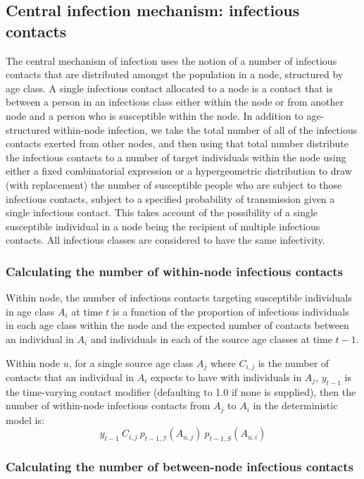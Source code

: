 \documentclass[11pt]{article}
\begin{document}
\subsection{Central infection mechanism: infectious contacts }

The central mechanism of infection uses the notion of a number of infectious contacts that are distributed amongst the population in a node, structured by age class.  A single infectious contact allocated to a node is a contact that is between a person in an infectious class either within the node or from another node and a person who is susceptible within the node.  In addition to age-structured within-node infection, we take the total number of all of the infectious contacts exerted from other nodes, and then using that total number distribute the infectious contacts to a number of target individuals within the node using either a fixed combinatorial expression or a hypergeometric distribution to draw (with replacement) the number of susceptible people who are subject to those infectious contacts, subject to a specified probability of transmission given a single infectious contact.  This takes account of the possibility of a single susceptible individual in a node being the recipient of multiple infectious contacts.   All infectious classes are considered to have the same infectivity.  

\subsubsection{Calculating the number of within-node infectious contacts}

Within node, the number of infectious contacts targeting susceptible individuals in age class $A_i$ at time $t$ is a function of the proportion of infectious individuals in each age class  within the node and the expected number of contacts between an individual in $A_i$ and individuals in each of the source age classes at time $t-1$. 

Within node $u$, for a single source age class $A_j$ where $C_{i,j}$ is the number of contacts that an individual in $A_i$ expects to have with individuals in $A_j$, $y_{t-1}$ is the time-varying contact modifier (defaulting to 1.0 if none is supplied), then the number of within-node infectious contacts from $A_j$ to $A_i$ in the deterministic model is: 
$$
y_{t-1}~C_{i,j}~p_{t-1, \mathcal{I}}(A_{u,j})~ p_{t-1, S}(A_{u,i}) 
$$

\subsubsection{Calculating the number of between-node infectious contacts}
\end{document}
